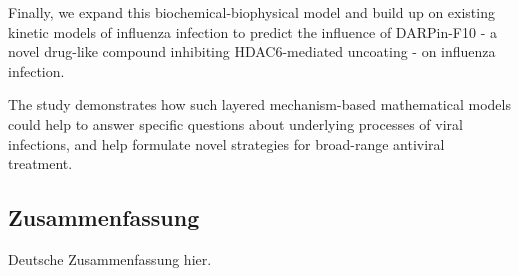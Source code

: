 Finally, we expand this biochemical-biophysical model and build up on existing kinetic models of influenza infection to predict the influence of DARPin-F10 - a novel drug-like compound inhibiting HDAC6-mediated uncoating - on influenza infection.

The study demonstrates how such layered mechanism-based mathematical models could help to answer specific questions about underlying processes of viral infections, and help formulate novel strategies for broad-range antiviral treatment.

\endgroup

\cleardoublepage%

\begingroup
\let\clearpage\relax
\let\cleardoublepage\relax
\let\cleardoublepage\relax

\begin{otherlanguage}{ngerman}
\chapter*{Zusammenfassung}

Deutsche Zusammenfassung hier.

\end{otherlanguage}

\endgroup

\vfill